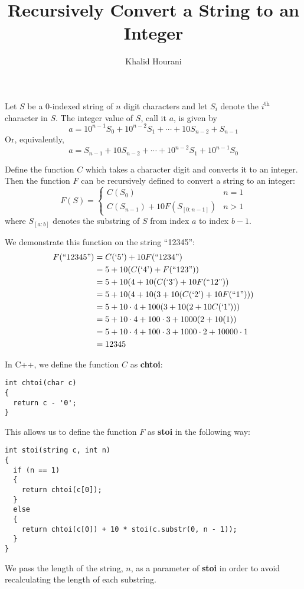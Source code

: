 \documentclass[a4paper]{article}
\title{Recursively Convert a String to an Integer}
\author{Khalid Hourani}
\begin{document}
Let $S$ be a 0-indexed string of $n$ digit characters and let $S_i$ denote the $i^{\text{th}}$ character in $S$. The integer value of $S$, call it $a$, is given by \[a=10^{n-1}S_0+10^{n-2}S_1+\cdots+10S_{n-2}+S_{n-1}\] Or, equivalently, \[a=S_{n-1}+10S_{n-2}+\cdots+10^{n-2}S_1+10^{n-1}S_0\]

Define the function $C$ which takes a character digit and converts it to an integer. Then the function $F$ can be recursively defined to convert a string to an integer: \[F(S)=\begin{cases}C(S_0) & n = 1\\C(S_{n-1}) + 10F(S_{[0:n-1]}) & n > 1\end{cases}\] where $S_{[a:b]}$ denotes the substring of $S$ from index $a$ to index $b-1$.

We demonstrate this function on the string ``12345'':\begin{align*}F(``12345\text{''})&=C(`5\text{'})+10F(``1234\text{''})\\&=5+10(C(`4\text{'})+F(``123\text{''}))
\\&=5+10(4+10(C(`3\text{'})+10F(``12\text{''}))
\\&=5+10(4+10(3+10(C(`2\text{'})+10F(``1\text{''})))
\\&=5+10\cdot4+100(3+10(2+10C(`1\text{'})))
\\&=5+10\cdot4+100\cdot3+1000(2+10(1))
\\&=5+10\cdot4+100\cdot3+1000\cdot2+10000\cdot1
\\&=12345\end{align*}


In C++, we define the function $C$ as \textbf{chtoi}:

\begin{verbatim}
int chtoi(char c)
{
  return c - '0';
}
\end{verbatim}

This allows us to define the function $F$ as \textbf{stoi} in the following way:

\begin{verbatim}
int stoi(string c, int n)
{
  if (n == 1)
  {
    return chtoi(c[0]);
  }
  else
  {
    return chtoi(c[0]) + 10 * stoi(c.substr(0, n - 1));
  }
}
\end{verbatim}

We pass the length of the string, $n$, as a parameter of \textbf{stoi} in order to avoid recalculating the length of each substring. 
\end{document}
